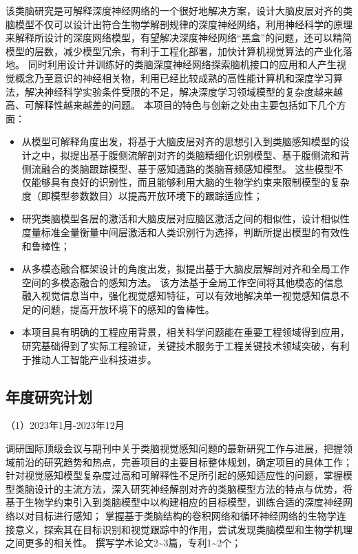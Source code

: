 \documentclass[a4paper,zihao=-4]{article}
\begin{document}

该类脑研究是可解释深度神经网络的一个很好地解决方案，设计大脑皮层对齐的类脑模型不仅可以设计出符合生物学解剖规律的深度神经网络，利用神经科学的原理来解释所设计的深度网络模型，有望解决深度神经网络“黑盒”的问题，还可以精简模型的层数，减少模型冗余，有利于工程化部署，加快计算机视觉算法的产业化落地。
同时利用设计并训练好的类脑深度神经网络探索脑机接口的应用和人产生视觉概念乃至意识的神经相关物，利用已经比较成熟的高性能计算机和深度学习算法，解决神经科学实验条件受限的不足，解决深度学习领域模型的复杂度越来越高、可解释性越来越差的问题。
本项目的特色与创新之处由主要包括如下几个方面：

\begin{itemize}
	\item 从模型可解释角度出发，将基于大脑皮层对齐的思想引入到类脑感知模型的设计之中，拟提出基于腹侧流解剖对齐的类脑精细化识别模型、基于腹侧流和背侧流融合的类脑跟踪模型、基于感知通路的类脑音频感知模型。
	这些模型不仅能够具有良好的识别性，而且能够利用大脑的生物学约束来限制模型的复杂度（即模型参数数目）以提高开放环境下的跟踪适应性；
	\item 研究类脑模型各层的激活和大脑皮层对应脑区激活之间的相似性，设计相似性度量标准全量衡量中间层激活和人类识别行为选择，判断所提出模型的有效性和鲁棒性；
	\item 从多模态融合框架设计的角度出发，拟提出基于大脑皮层解剖对齐和全局工作空间的多模态融合的感知方法。
	该方法基于全局工作空间将其他模态的信息融入视觉信息当中，强化视觉感知特征，可以有效地解决单一视觉感知信息不足的问题，提高开放环境下的感知的鲁棒性。
	\item 本项目具有明确的工程应用背景，相关科学问题能在重要工程领域得到应用，研究基础得到了实际工程验证，关键技术服务于工程关键技术领域突破，有利于推动人工智能产业科技进步。
\end{itemize}



\textcolor{NsfcBlue}{\subsection{年度研究计划}}

（1）2023年1月-2023年12月

调研国际顶级会议与期刊中关于类脑视觉感知问题的最新研究工作与进展，把握领域前沿的研究趋势和热点，完善项目的主要目标整体规划，确定项目的具体工作；
针对视觉感知模型复杂度过高和可解释性不足所引起的感知适应性的问题，掌握模型类脑设计的主流方法，深入研究神经解剖对齐的类脑模型方法的特点与优势，将基于生物学约束引入到类脑模型中以构建相应的目标模型，训练合适的深度神经网络以对目标进行感知；
掌握基于类脑结构的卷积网络和循环神经网络的生物学连接意义，探索其在目标识别和视觉跟踪中的作用，尝试发现类脑模型和生物学机理之间更多的相关性。
撰写学术论文2\textasciitilde3篇，专利1\textasciitilde2个；
\end{document}
